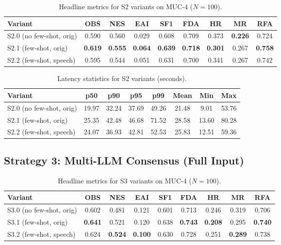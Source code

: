 \begin{table}[H]
 \centering
\caption{Headline metrics for S2 variants on MUC-4 ($N{=}100$).}
\label{tab:s2-variants-headline}
\begin{tabular}{lcccccccc}
\toprule
 Variant & OBS & NES & EAI & SF1 & FDA & HR & MR & RFA \\
\midrule
 S2.0 (no few-shot, orig) & 0.590 & 0.560 & 0.029 & 0.608 & 0.709 & 0.373 & \textbf{0.226} & 0.724 \\
 S2.1 (few-shot, orig) & \textbf{0.619} & \textbf{0.555} & \textbf{0.064} & \textbf{0.639} & \textbf{0.718} & \textbf{0.301} & 0.267 & \textbf{0.758} \\
 S2.2 (few-shot, speech) & 0.595 & 0.544 & 0.051 & 0.631 & 0.700 & 0.341 & 0.267 & 0.742 \\
\bottomrule
\end{tabular}
\end{table}

\begin{table}[H]
 \centering
\caption{Latency statistics for S2 variants (seconds).}
\label{tab:s2-latency-all}
\begin{tabular}{lccccccc}
\toprule
 Variant & p50 & p90 & p95 & p99 & Mean & Min & Max \\
\midrule
 S2.0 (no few-shot, orig) & 19.97 & 32.24 & 37.69 & 49.26 & 21.48 & 9.01 & 53.76 \\
 S2.1 (few-shot, orig) & 25.35 & 42.48 & 46.68 & 71.52 & 28.58 & 13.60 & 80.28 \\
 S2.2 (few-shot, speech) & 24.07 & 36.93 & 42.81 & 52.53 & 25.83 & 12.51 & 59.36 \\
\bottomrule
\end{tabular}
\end{table}

\subsection{Strategy 3: Multi-LLM Consensus (Full Input)}
\label{appendix:s3-results}

\begin{table}[H]
 \centering
\caption{Headline metrics for S3 variants on MUC-4 ($N{=}100$).}
\label{tab:s3-variants-headline}
\begin{tabular}{lcccccccc}
\toprule
 Variant & OBS & NES & EAI & SF1 & FDA & HR & MR & RFA \\
\midrule
 S3.0 (no few-shot, orig) & 0.602 & 0.481 & 0.121 & 0.601 & 0.713 & 0.246 & 0.319 & 0.706 \\
 S3.1 (few-shot, orig) & \textbf{0.641} & 0.521 & 0.120 & 0.638 & \textbf{0.743} & \textbf{0.208} & 0.295 & \textbf{0.740} \\
 S3.2 (few-shot, speech) & 0.624 & \textbf{0.524} & \textbf{0.100} & 0.630 & 0.728 & 0.251 & \textbf{0.289} & 0.738 \\
\bottomrule
\end{tabular}
\end{table}

